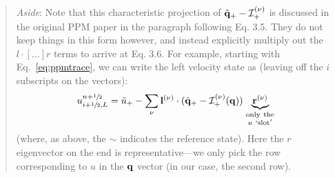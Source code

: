 \begin{quote}
\noindent\makebox[\linewidth]{\rule{0.9\textwidth}{1pt}}
{\em Aside}:
Note that this characteristic projection of $\tilde{{\bf q}}_+ -
{\mathcal{I}}_+^{(\nu)}$ is discussed in the original PPM paper in the
paragraph following Eq. 3.5.  They do not keep things in this form
however, and instead explicitly multiply out the $l\cdot [\ldots] r$
terms to arrive at Eq. 3.6.  For example, starting with
Eq.~\ref{eq:ppmtrace},
we can write the left velocity state as (leaving off the $i$
subscripts on the vectors):
\begin{equation}
u_{i+{\sfrac{1}{2}},L}^{n+{\sfrac{1}{2}}} =
  \tilde{u}_+ - \sum_\nu {\bf l}^{(\nu)} \cdot
      ( \tilde{{\bf q}}_+ -  {\mathcal{I}}_+^{(\nu)}({\bf q}) )
    \underbrace{{\bf r}^{(\nu)}}_{\begin{smallmatrix}\mathrm{only~the}\\ u~\mathrm{`slot'} \end{smallmatrix}}
\end{equation}
(where, as above, the $\sim$ indicates the reference state).
Here the $r$ eigenvector on the end is representative---we only pick
the row corresponding to $u$ in the ${\bf q}$ vector (in our case, the
second row).


\end{quote}
